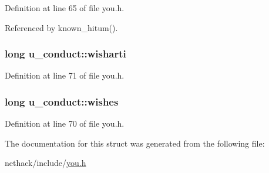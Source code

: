 Definition at line 65 of file you.\+h.



Referenced by known\+\_\+hitum().

\hypertarget{structu__conduct_a07e1d6718f1275907e2d1be5274974d0}{
\subsubsection[{wisharti}]{\setlength{\rightskip}{0pt plus 5cm}long u\+\_\+conduct\+::wisharti}}\label{structu__conduct_a07e1d6718f1275907e2d1be5274974d0}


Definition at line 71 of file you.\+h.

\hypertarget{structu__conduct_af0937aebdb697b63a7572cb74463aeae}{
\subsubsection[{wishes}]{\setlength{\rightskip}{0pt plus 5cm}long u\+\_\+conduct\+::wishes}}\label{structu__conduct_af0937aebdb697b63a7572cb74463aeae}


Definition at line 70 of file you.\+h.



The documentation for this struct was generated from the following file\+:\begin{DoxyCompactItemize}
\item 
nethack/include/\hyperlink{you_8h}{you.\+h}\end{DoxyCompactItemize}
